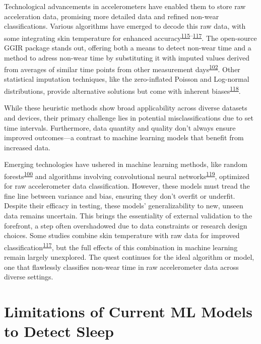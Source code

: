 \documentclass[
  10pt,
]{scrbook}
\begin{document}
Technological advancements in accelerometers have enabled them to store
raw acceleration data, promising more detailed data and refined non-wear
classifications. Various algorithms have emerged to decode this raw
data, with some integrating skin temperature for enhanced
accuracy\textsuperscript{\protect\hyperlink{ref-duncan_wear-time_2018}{115}--\protect\hyperlink{ref-zhou_classification_2015}{117}}.
The open-source GGIR package stands out, offering both a means to detect
non-wear time and a method to adress non-wear time by substituting it
with imputed values derived from averages of similar time points from
other measurement
days\textsuperscript{\protect\hyperlink{ref-migueles_ggir_2019}{102}}.
Other statistical imputation techniques, like the zero-inflated Poisson
and Log-normal distributions, provide alternative solutions but come
with inherent
biases\textsuperscript{\protect\hyperlink{ref-lee_missing_2018}{118}}.

While these heuristic methods show broad applicability across diverse
datasets and devices, their primary challenge lies in potential
misclassifications due to set time intervals. Furthermore, data quantity
and quality don't always ensure improved outcomes---a contrast to
machine learning models that benefit from increased data.

Emerging technologies have ushered in machine learning methods, like
random
forests\textsuperscript{\protect\hyperlink{ref-sundararajan_sleep_2021}{100}}
and algorithms involving convolutional neural
networks\textsuperscript{\protect\hyperlink{ref-syed_novel_2021}{119}},
optimized for raw accelerometer data classification. However, these
models must tread the fine line between variance and bias, ensuring they
don't overfit or underfit. Despite their efficacy in testing, these
models' generalizability to new, unseen data remains uncertain. This
brings the essentiality of external validation to the forefront, a step
often overshadowed due to data constraints or research design choices.
Some studies combine skin temperature with raw data for improved
classification\textsuperscript{\protect\hyperlink{ref-zhou_classification_2015}{117}},
but the full effects of this combination in machine learning remain
largely unexplored. The quest continues for the ideal algorithm or
model, one that flawlessly classifies non-wear time in raw accelerometer
data across diverse settings.

\hypertarget{limitations-of-current-ml-models-to-detect-sleep}{%
\section{Limitations of Current ML Models to Detect
Sleep}\label{limitations-of-current-ml-models-to-detect-sleep}}
\end{document}
